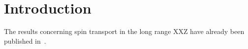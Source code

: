 \chapter{Introduction}
\thispagestyle{chapterBeginStyle}

The results concerning spin transport in the long range XXZ have already been published in~\textcite{Mierzejewski2023}.